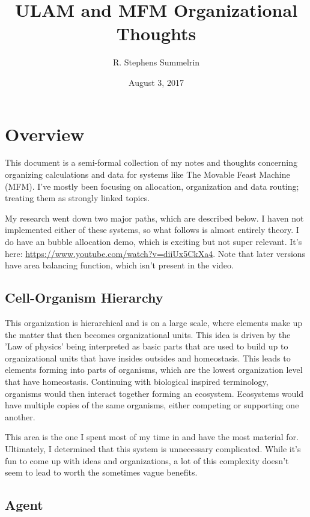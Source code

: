 \documentclass[article,12pt,oneside]{memoir}
\title{ULAM and MFM Organizational Thoughts}
\date{August 3, 2017}
\author{R. Stephens Summelrin}
\begin{document}
\maketitle
\tableofcontents

\pagebreak
\chapter{Overview}

This document is a semi-formal collection of my notes and thoughts concerning organizing calculations and data for systems like The Movable Feast Machine (MFM).
I've mostly been focusing on allocation, organization and data routing; treating them as strongly linked topics.

My research went down two major paths, which are described below.
I haven not implemented either of these systems, so what follows is almost entirely theory.
I do have an bubble allocation demo, which is exciting but not super relevant.
It's here: \url{https://www.youtube.com/watch?v=diiUx5CkXa4}.
Note that later versions have area balancing function, which isn't present in the video.


\section{Cell-Organism Hierarchy}

This organization is hierarchical and is on a large scale, where elements make up the matter that then becomes organizational units.
This idea is driven by the 'Law of physics' being interpreted as basic parts that are used to build up to organizational units that have insides outsides and homeostasis.
This leads to elements forming into parts of organisms, which are the lowest organization level that have homeostasis.
Continuing with biological inspired terminology, organisms would then interact together forming an ecosystem.
Ecosystems would have multiple copies of the same organisms, either competing or supporting one another.

This area is the one I spent most of my time in and have the most material for.
Ultimately, I determined that this system is unnecessary complicated.
While it's fun to come up with ideas and organizations, a lot of this complexity doesn't seem to lead to worth the sometimes vague benefits.


\section{Agent}
\end{document}
